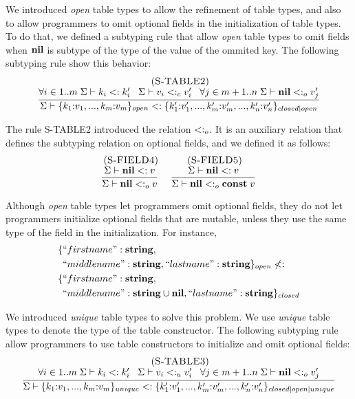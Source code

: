 We introduced \emph{open} table types to allow the refinement
of table types, and also to allow programmers to omit optional
fields in the initialization of table types.
To do that, we defined a subtyping rule that allow \emph{open}
table types to omit fields when $\mathbf{nil}$ is subtype of the type of
the value of the ommited key.
The following subtyping rule show this behavior:
\[
\begin{array}{c}
\; (\textsc{S-TABLE2})\\
\dfrac{\forall i \in 1..m \; \Sigma \vdash k_{i} <: k_{i}' \;\;\;
       \Sigma \vdash v_{i} <:_{c} v_{i}' \;\;\;
       \forall j \in m+1..n \; \Sigma \vdash \mathbf{nil} <:_{o} v_{j}'}
      {\Sigma \vdash \{k_{1}{:}v_{1}, ..., k_{m}{:}v_{m}\}_{open} <:
                    \{k_{1}'{:}v_{1}', ..., k_{m}'{:}v_{m}', ..., k_{n}'{:}v_{n}'\}_{closed|open}}
\end{array}
\]

The rule \textsc{S-TABLE2} introduced the relation $<:_{o}$.
It is an auxiliary relation that defines the subtyping relation
on optional fields, and we defined it as follows:
\[
\begin{array}{c}
\begin{array}{c}
\; (\textsc{S-FIELD4})\\
\dfrac{\Sigma \vdash \mathbf{nil} <: v}
      {\Sigma \vdash \mathbf{nil} <:_{o} v}
\end{array}
\;
\begin{array}{c}
\; (\textsc{S-FIELD5})\\
\dfrac{\Sigma \vdash \mathbf{nil} <: v}
      {\Sigma \vdash \mathbf{nil} <:_{o} \mathbf{const} \; v}
\end{array}
\end{array}
\]

Although \emph{open} table types let programmers omit optional fields,
they do not let programmers initialize optional fields that are
mutable, unless they use the same type of the field in the initialization.
For instance,
\begin{align*}
\{ & ``firstname":\mathbf{string},\\
   & ``middlename":\mathbf{string}, ``lastname":\mathbf{string} \}_{open} \not <: \\
\{ & ``firstname":\mathbf{string}, \\
   & ``middlename":\mathbf{string} \cup \mathbf{nil}, ``lastname":\mathbf{string} \}_{closed}
\end{align*}

We introduced \emph{unique} table types to solve this problem.
We use \emph{unique} table types to denote the type of the
table constructor.
The following subtyping rule allow programmers to use table constructors
to initialize and omit optional fields:
\[
\begin{array}{c}
\; (\textsc{S-TABLE3})\\
\dfrac{\forall i \in 1..m \; \Sigma \vdash k_{i} <: k_{i}' \;\;\;
       \Sigma \vdash v_{i} <:_{u} v_{i}' \;\;\;
       \forall j \in m+1..n \; \Sigma \vdash \mathbf{nil} <:_{o} v_{j}'}
      {\Sigma \vdash \{k_{1}{:}v_{1}, ..., k_{m}{:}v_{m}\}_{unique} <:
                    \{k_{1}'{:}v_{1}', ..., k_{m}'{:}v_{m}', ..., k_{n}'{:}v_{n}'\}_{closed|open|unique}}
\end{array}
\]

